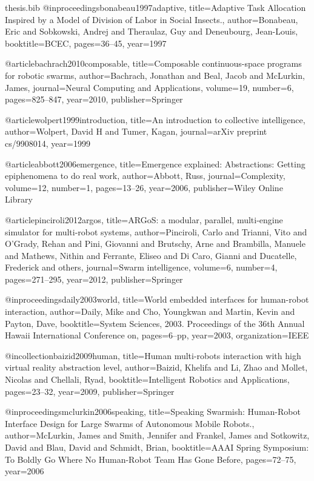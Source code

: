 \documentclass[a4paper, 12pt]{report}
\begin{document}
\begin{filecontents}{thesis.bib}
@inproceedings{bonabeau1997adaptive,
  title={Adaptive Task Allocation Inspired by a Model of Division of Labor in Social Insects.},
  author={Bonabeau, Eric and Sobkowski, Andrej and Theraulaz, Guy and Deneubourg, Jean-Louis},
  booktitle={BCEC},
  pages={36--45},
  year={1997}
}

@article{bachrach2010composable,
  title={Composable continuous-space programs for robotic swarms},
  author={Bachrach, Jonathan and Beal, Jacob and McLurkin, James},
  journal={Neural Computing and Applications},
  volume={19},
  number={6},
  pages={825--847},
  year={2010},
  publisher={Springer}
}

@article{wolpert1999introduction,
  title={An introduction to collective intelligence},
  author={Wolpert, David H and Tumer, Kagan},
  journal={arXiv preprint cs/9908014},
  year={1999}
}

@article{abbott2006emergence,
  title={Emergence explained: Abstractions: Getting epiphenomena to do real work},
  author={Abbott, Russ},
  journal={Complexity},
  volume={12},
  number={1},
  pages={13--26},
  year={2006},
  publisher={Wiley Online Library}
}

@article{pinciroli2012argos,
  title={ARGoS: a modular, parallel, multi-engine simulator for multi-robot systems},
  author={Pinciroli, Carlo and Trianni, Vito and O’Grady, Rehan and Pini, Giovanni and Brutschy, Arne and Brambilla, Manuele and Mathews, Nithin and Ferrante, Eliseo and Di Caro, Gianni and Ducatelle, Frederick and others},
  journal={Swarm intelligence},
  volume={6},
  number={4},
  pages={271--295},
  year={2012},
  publisher={Springer}
}

@inproceedings{daily2003world,
  title={World embedded interfaces for human-robot interaction},
  author={Daily, Mike and Cho, Youngkwan and Martin, Kevin and Payton, Dave},
  booktitle={System Sciences, 2003. Proceedings of the 36th Annual Hawaii International Conference on},
  pages={6--pp},
  year={2003},
  organization={IEEE}
}

@incollection{baizid2009human,
  title={Human multi-robots interaction with high virtual reality abstraction level},
  author={Baizid, Khelifa and Li, Zhao and Mollet, Nicolas and Chellali, Ryad},
  booktitle={Intelligent Robotics and Applications},
  pages={23--32},
  year={2009},
  publisher={Springer}
}

@inproceedings{mclurkin2006speaking,
  title={Speaking Swarmish: Human-Robot Interface Design for Large Swarms of Autonomous Mobile Robots.},
  author={McLurkin, James and Smith, Jennifer and Frankel, James and Sotkowitz, David and Blau, David and Schmidt, Brian},
  booktitle={AAAI Spring Symposium: To Boldly Go Where No Human-Robot Team Has Gone Before},
  pages={72--75},
  year={2006}
}


\end{filecontents}

\nocite{*}


\end{document}
